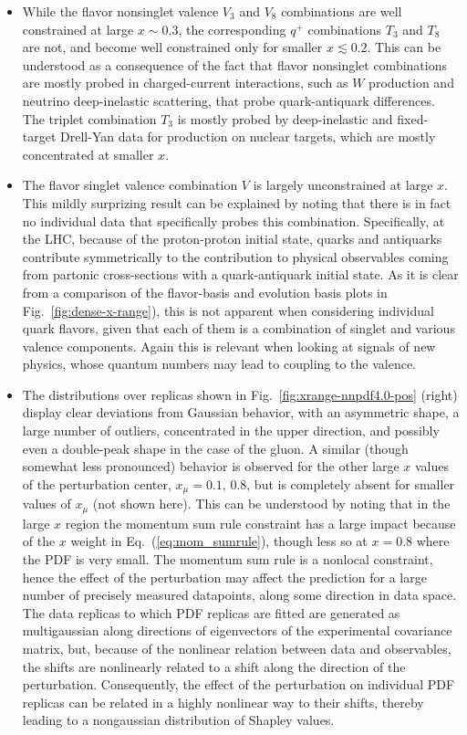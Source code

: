 \documentclass[11pt,a4paper]{article}
\begin{document}
\begin{itemize}
    \item While the flavor nonsinglet valence $V_3$ and $V_8$ combinations are well constrained at large $x\sim 0.3$, the corresponding $q^+$ combinations $T_3$ and $T_8$ are not, and become well constrained only for smaller $x\lesssim 0.2$. This can be understood as a consequence of the fact that flavor nonsinglet combinations are mostly probed in charged-current interactions, such as $W$ production and neutrino deep-inelastic scattering, that probe quark-antiquark differences. The triplet combination $T_3$ is mostly probed by deep-inelastic and fixed-target Drell-Yan data for production on nuclear targets, which are mostly concentrated  at smaller $x$.
    \item The flavor singlet valence combination $V$ is largely unconstrained at large $x$. This mildly surprizing result can be explained by noting that there is in fact no individual data that specifically probes this combination. Specifically, at the LHC, because of the proton-proton initial state, quarks and antiquarks  contribute symmetrically to the contribution to physical observables coming from partonic cross-sections with a quark-antiquark initial state. As it is clear from a comparison of the flavor-basis and evolution basis plots in  Fig.~\ref{fig:dense-x-range}), this  is not apparent when considering individual quark flavors, given that each of them is a combination of singlet and various valence components.  Again this is relevant when looking at signals of new physics, whose quantum numbers may lead to coupling to the valence.
    \item The distributions over replicas shown in Fig.~\ref{fig:xrange-nnpdf4.0-pos} (right) display clear deviations from Gaussian behavior, with an asymmetric shape, a  large number of outliers, concentrated in the upper direction, and possibly even a double-peak shape in the case of the gluon. A similar (though somewhat less pronounced) behavior is observed for the other large $x$ values of the perturbation center, $x_\mu=0.1,\,0.8$, but is completely absent for smaller values of $x_\mu$ (not shown here). This can be understood by noting that in the large $x$ region the momentum sum rule constraint has a large impact because of the $x$ weight in Eq.~(\ref{eq:mom_sumrule}), though less so at $x=0.8$ where the PDF is very small. The momentum sum rule is a nonlocal constraint, hence the effect of the perturbation may affect the prediction for a large number of precisely measured datapoints, along some direction in   data space. The data replicas to which PDF replicas are fitted are generated as multigaussian along directions of eigenvectors of the experimental covariance matrix, but, because of the nonlinear relation between data and observables, the shifts are nonlinearly related to a shift along the direction of the perturbation. Consequently, the effect of the perturbation on individual PDF replicas can be related in  a highly nonlinear way to their shifts, thereby leading to a nongaussian distribution of Shapley values.
\end{itemize}
\end{document}
